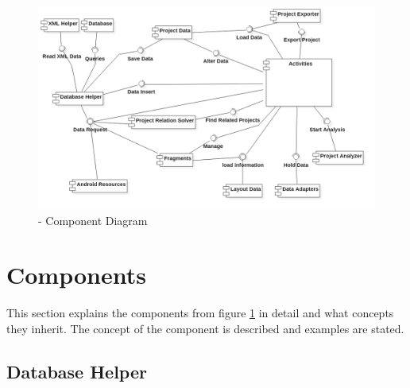 \begin{figure}[h] 
	\centering 
	\includegraphics[width=14cm]{images/components.png} 
	\caption{- Component Diagram} 
	\label{fig:components}
\end{figure}

\section{Components}

This section explains the components from figure \ref{fig:components} in detail and what concepts they inherit. The concept of the component is described and examples are stated.

\subsection{Database Helper}

